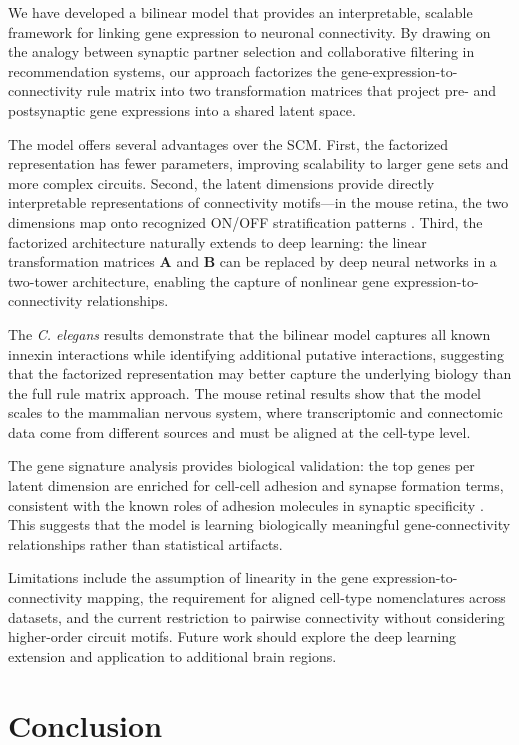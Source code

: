\documentclass[11pt]{article}
\begin{document}
We have developed a bilinear model that provides an interpretable, scalable framework for linking gene expression to neuronal connectivity. By drawing on the analogy between synaptic partner selection and collaborative filtering in recommendation systems, our approach factorizes the gene-expression-to-connectivity rule matrix into two transformation matrices that project pre- and postsynaptic gene expressions into a shared latent space.

The model offers several advantages over the SCM. First, the factorized representation has fewer parameters, improving scalability to larger gene sets and more complex circuits. Second, the latent dimensions provide directly interpretable representations of connectivity motifs---in the mouse retina, the two dimensions map onto recognized ON/OFF stratification patterns \citep{masland2012neuronal}. Third, the factorized architecture naturally extends to deep learning: the linear transformation matrices $\mathbf{A}$ and $\mathbf{B}$ can be replaced by deep neural networks in a two-tower architecture, enabling the capture of nonlinear gene expression-to-connectivity relationships.

The \textit{C. elegans} results demonstrate that the bilinear model captures all known innexin interactions while identifying additional putative interactions, suggesting that the factorized representation may better capture the underlying biology than the full rule matrix approach. The mouse retinal results show that the model scales to the mammalian nervous system, where transcriptomic and connectomic data come from different sources and must be aligned at the cell-type level.

The gene signature analysis provides biological validation: the top genes per latent dimension are enriched for cell-cell adhesion and synapse formation terms, consistent with the known roles of adhesion molecules in synaptic specificity \citep{sanes2015synaptic, sudhof2018towards}. This suggests that the model is learning biologically meaningful gene-connectivity relationships rather than statistical artifacts.

Limitations include the assumption of linearity in the gene expression-to-connectivity mapping, the requirement for aligned cell-type nomenclatures across datasets, and the current restriction to pairwise connectivity without considering higher-order circuit motifs. Future work should explore the deep learning extension and application to additional brain regions.

\section{Conclusion}
\end{document}

